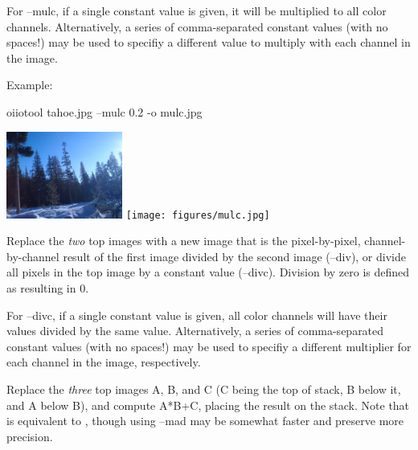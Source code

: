 For {\cf --mulc}, if a single constant value is given, it will be multiplied
to all color channels. Alternatively, a series of comma-separated constant
values (with no spaces!) may be used to specifiy a different value to
multiply with each channel in the image.

\noindent Example:
\begin{code}
    oiiotool tahoe.jpg --mulc 0.2 -o mulc.jpg
\end{code}
\spc \includegraphics[width=1.5in]{figures/tahoe-small.jpg}
\raisebox{40pt}{\large $\rightarrow$}
\texttt{[image: figures/mulc.jpg]} \\
\apiend

Replace the \emph{two} top images with a new image that is the
pixel-by-pixel, channel-by-channel result of the first image divided by
the second image ({\cf --div}), or divide all
pixels in the top image by a constant value ({\cf --divc}).
Division by zero is defined as resulting in 0.

For {\cf --divc}, if a single constant value is given, all color channels
will have their values divided by the same value.  Alternatively, a series
of comma-separated constant values (with no spaces!) may be used to specifiy
a different multiplier for each channel in the image, respectively.
\apiend

Replace the \emph{three} top images A, B, and C (C being the top of stack, B
below it, and A below B), and compute A*B+C, placing the result on the
stack. Note that  is equivalent to ,
though using {\cf --mad} may be somewhat faster and preserve more precision.

\apiend


